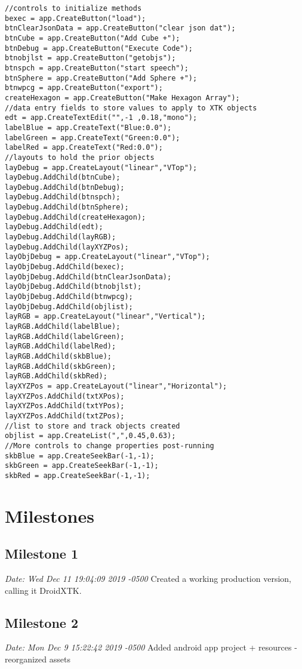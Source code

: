 \documentclass[sigconf]{acmart}
\begin{document}
\begin{verbatim}
//controls to initialize methods
bexec = app.CreateButton("load");
btnClearJsonData = app.CreateButton("clear json dat");
btnCube = app.CreateButton("Add Cube +");
btnDebug = app.CreateButton("Execute Code");
btnobjlst = app.CreateButton("getobjs");
btnspch = app.CreateButton("start speech");
btnSphere = app.CreateButton("Add Sphere +");
btnwpcg = app.CreateButton("export");
createHexagon = app.CreateButton("Make Hexagon Array");
//data entry fields to store values to apply to XTK objects
edt = app.CreateTextEdit("",-1 ,0.18,"mono");
labelBlue = app.CreateText("Blue:0.0");
labelGreen = app.CreateText("Green:0.0");
labelRed = app.CreateText("Red:0.0");
//layouts to hold the prior objects
layDebug = app.CreateLayout("linear","VTop");
layDebug.AddChild(btnCube);
layDebug.AddChild(btnDebug);
layDebug.AddChild(btnspch);
layDebug.AddChild(btnSphere);
layDebug.AddChild(createHexagon);
layDebug.AddChild(edt);
layDebug.AddChild(layRGB);
layDebug.AddChild(layXYZPos);
layObjDebug = app.CreateLayout("linear","VTop");
layObjDebug.AddChild(bexec);
layObjDebug.AddChild(btnClearJsonData);
layObjDebug.AddChild(btnobjlst);
layObjDebug.AddChild(btnwpcg);
layObjDebug.AddChild(objlist);
layRGB = app.CreateLayout("linear","Vertical");
layRGB.AddChild(labelBlue);
layRGB.AddChild(labelGreen);
layRGB.AddChild(labelRed);
layRGB.AddChild(skbBlue);
layRGB.AddChild(skbGreen);
layRGB.AddChild(skbRed);
layXYZPos = app.CreateLayout("linear","Horizontal");
layXYZPos.AddChild(txtXPos);
layXYZPos.AddChild(txtYPos);
layXYZPos.AddChild(txtZPos);
//list to store and track objects created
objlist = app.CreateList(",",0.45,0.63);
//More controls to change properties post-running
skbBlue = app.CreateSeekBar(-1,-1);
skbGreen = app.CreateSeekBar(-1,-1);
skbRed = app.CreateSeekBar(-1,-1);
\end{verbatim}

\newpage

\section{Milestones}

\subsection{Milestone 1}
\textit{Date:   Wed Dec 11 19:04:09 2019 -0500}\newline
Created a working production version, calling it DroidXTK.

\subsection{Milestone 2}
\textit{Date:   Mon Dec 9 15:22:42 2019 -0500}\newline
Added android app project + resources - reorganized assets
\end{document}
